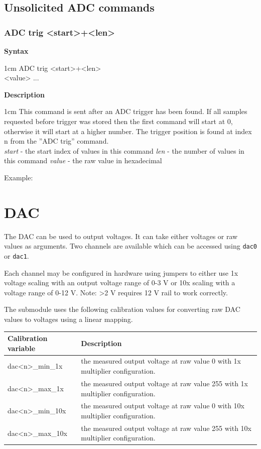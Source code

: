 \documentclass{article}[a4paper]
\begin{document}
\subsection{Unsolicited ADC commands}

\subsubsection{ADC trig <start>+<len>}
\begin{tcolorbox}
	{\bf Syntax}

	 1cm \dimexpr\linewidth-2cm\relax
	ADC trig <start>+<len> \\
	<value> ...

	\medskip
	{\bf Description}

	 1cm \dimexpr\linewidth-2cm\relax
	This command is sent after an ADC trigger has been found. If all samples
	requested before trigger was stored then the first command will start at 0,
	otherwise it will start at a higher number. The trigger position is found at
	index n from the ''ADC trig'' command.
	\medskip \\
	{\it start} - the start index of values in this command
	{\it len} - the number of values in this command
	{\it value} - the raw value in hexadecimal

	\medskip
	Example: \texttt{}
\end{tcolorbox}

\section{DAC}

The DAC can be used to output voltages. It can take either voltages or raw
values as arguments. Two channels are available
which can be accessed using \texttt{dac0} or \texttt{dac1}.

Each channel may be configured in hardware using jumpers to either use 1x
voltage scaling with an output voltage range of 0-3 V or 10x scaling with a
voltage range of 0-12 V. Note: >2 V requires 12 V rail to work correctly.

The submodule uses the following calibration values for converting raw DAC values to
voltages using a linear mapping.

\medskip

\noindent
\begin{tabularx}{\textwidth}{|p{4cm}|X|}
\hline
Calibration variable & Description \\
\hline
dac<n>\_min\_1x & the measured output voltage at raw value 0 with 1x multiplier
configuration. \\
\hline
dac<n>\_max\_1x & the measured output voltage at raw value 255 with 1x multiplier
configuration. \\
\hline
dac<n>\_min\_10x & the measured output voltage at raw value 0 with 10x multiplier
configuration. \\
\hline
dac<n>\_max\_10x & the measured output voltage at raw value 255 with 10x multiplier
configuration. \\
\hline
\end{tabularx}
\end{document}
